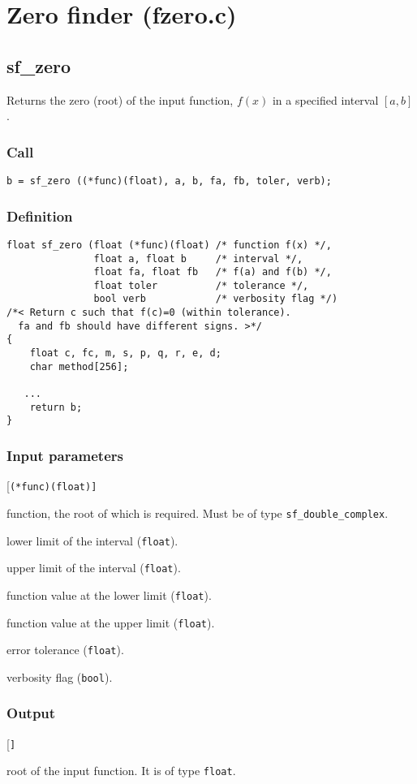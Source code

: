 \section{Zero finder (fzero.c)}




\subsection{{sf\_zero}}
Returns the zero (root) of the input function, $f(x)$ in a specified interval $[a,b]$.

\subsubsection*{Call}
\begin{verbatim}b = sf_zero ((*func)(float), a, b, fa, fb, toler, verb);\end{verbatim}

\subsubsection*{Definition}
\begin{verbatim}
float sf_zero (float (*func)(float) /* function f(x) */, 
               float a, float b     /* interval */, 
               float fa, float fb   /* f(a) and f(b) */,
               float toler          /* tolerance */, 
               bool verb            /* verbosity flag */)
/*< Return c such that f(c)=0 (within tolerance). 
  fa and fb should have different signs. >*/
{
    float c, fc, m, s, p, q, r, e, d;
    char method[256];

   ...
    return b;
}
\end{verbatim}

\subsubsection*{Input parameters}
\begin{desclist}{\tt }{\quad}[\tt (*func)(float)]
   \setlength\itemsep{0pt}
   \item[(*func)(float)] function, the root of which is required. Must be of type \texttt{sf\_double\_complex}.  
   \item[a]     lower limit of the interval (\texttt{float}).
   \item[b]     upper limit of the interval (\texttt{float}).
   \item[fa]    function value at the lower limit (\texttt{float}).
   \item[fb]    function value at the upper limit (\texttt{float}).
   \item[toler] error tolerance (\texttt{float}).
   \item[verb]  verbosity flag (\texttt{bool}).
\end{desclist}

\subsubsection*{Output}
\begin{desclist}{\tt }{\quad}[\tt ]
   \setlength\itemsep{0pt}  
   \item[b] root of the input function. It is of type \texttt{float}.
\end{desclist}


